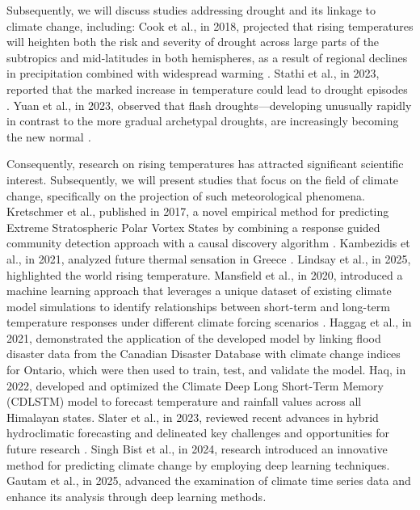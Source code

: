 \documentclass[12pt]{Definitions/academia}
\begin{document}
Subsequently, we will discuss studies addressing drought and its linkage
to climate change, including: Cook et al., in 2018, projected that
rising temperatures will heighten both the risk and severity of drought
across large parts of the subtropics and mid-latitudes in both hemispheres,
as a result of regional declines in precipitation combined with widespread
warming \textit{\cite{Cook 2018}}. Stathi et al., in 2023, reported
that the marked increase in temperature could lead to drought episodes
\textit{\cite{Stathi 2023}}. Yuan et al., in 2023, observed that
flash droughts---developing unusually rapidly in contrast to the
more gradual archetypal droughts, are increasingly becoming the new
normal \textit{\cite{Yuan 2023}.}

Consequently, research on rising temperatures has attracted significant
scientific interest. Subsequently, we will present studies that focus
on the field of climate change, specifically on the projection of
such meteorological phenomena. Kretschmer et al., published in 2017,
a novel empirical method for predicting Extreme Stratospheric Polar
Vortex States by combining a response guided community detection approach
with a causal discovery algorithm \textit{\cite{Kretschmer 2017}}.
Kambezidis et al., in 2021, analyzed future thermal sensation in Greece
\textit{\cite{Kambezidis 2021}.} Lindsay et al., in 2025, highlighted
the world rising temperature\textit{\cite{Lindsey 2025}}. Mansfield
et al., in 2020, introduced a machine learning approach that leverages
a unique dataset of existing climate model simulations to identify
relationships between short-term and long-term temperature responses
under different climate forcing scenarios \textit{\cite{Mansfield 2020}}.
Haggag et al., in 2021, demonstrated the application of the developed
model by linking flood disaster data from the Canadian Disaster Database
with climate change indices for Ontario, which were then used to train,
test, and validate the model\textit{\cite{Haggag 2021}}. Haq, in
2022, developed and optimized the Climate Deep Long Short-Term Memory
(CDLSTM) model to forecast temperature and rainfall values across
all Himalayan states\textit{\cite{Haq 2022}}. Slater et al., in 2023,
reviewed recent advances in hybrid hydroclimatic forecasting and delineated
key challenges and opportunities for future research \textit{\cite{Slater 2023}.}
Singh Bist et al., in 2024, research introduced an innovative method
for predicting climate change by employing deep learning techniques\textit{\cite{Bist 2024}}.
Gautam et al., in 2025, advanced the examination of climate time series
data and enhance its analysis through deep learning methods\textit{\cite{GAUTAM 2025}. }
\end{document}
